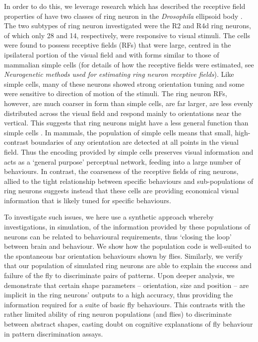 \documentclass[10pt]{article}
\begin{document}
In order to do this, we leverage research which has described the receptive field properties of have two classes of ring neuron in the \emph{Drosophila} ellipsoid body \cite{Seelig2013}. The two subtypes of ring neuron investigated were the R2 and R4d ring neurons, of which only 28 and 14, respectively, were responsive to visual stimuli. The cells were found to possess receptive fields (RFs) that were large, centred in the ipsilateral portion of the visual field and with forms similar to those of mammalian simple cells \cite{Hubel1962} (for details of how the receptive fields were estimated, see \emph{Neurogenetic methods used for estimating ring neuron receptive fields}). Like simple cells, many of these neurons showed strong orientation tuning and some were sensitive to direction of motion of the stimuli. The ring neuron RFs, however, are much coarser in form than simple cells, are far larger, are less evenly distributed across the visual field and respond mainly to orientations near the vertical. This suggests that ring neurons might have a less general function than simple cells \cite{Wystrach2014}. In mammals, the population of simple cells means that small, high-contrast boundaries of any orientation are detected at all points in the visual field. Thus the encoding provided by simple cells preserves visual information and acts as a `general purpose' perceptual network, feeding into a large number of behaviours. In contrast, the coarseness of the receptive fields of ring neurons, allied to the tight relationship between specific behaviours and sub-populations of ring neurons suggests instead that these cells are providing economical visual information that is likely tuned for specific behaviours.

To investigate such issues, we here use a synthetic approach whereby investigations, in simulation, of the information provided by these populations of neurons can be related to behavioural requirements, thus `closing the loop' between brain and behaviour. We show how the population code is well-suited to the spontaneous bar orientation behaviours shown by flies. Similarly, we verify that our population of simulated ring neurons are able to explain the success and failure of the fly to discriminate pairs of patterns. Upon deeper analysis, we demonstrate that certain shape parameters -- orientation, size and position -- are implicit in the ring neurons' outputs to a high accuracy, thus providing the information required for a suite of basic fly behaviours. This contrasts with the rather limited ability of ring neuron populations (and flies) to discriminate between abstract shapes, casting doubt on cognitive explanations of fly behaviour in pattern discrimination assays.
\end{document}
